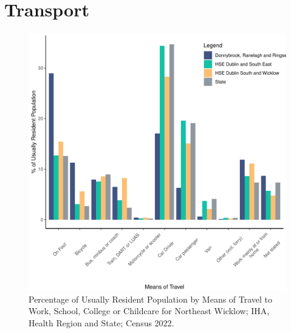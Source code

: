 \documentclass{article}
\begin{document}
\section{Transport}\label{sect:Trans}
\begin{figure}[H]
	\centering
	\includegraphics[width = 120mm]{../figures/TravelED.pdf}
	\caption{Percentage of Usually Resident Population by Means of Travel to Work, School, College or Childcare for Northeast Wicklow; IHA, Health Region and State; Census 2022.}
	\label{fig:vbnv}
	\end{figure}
\end{document}
